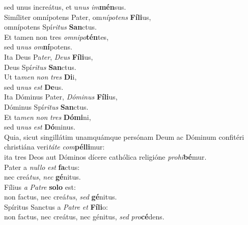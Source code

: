 \evenverse sed unus increátus, et u\textit{nus} \textit{im}\textbf{mén}sus.\\
\oddverse Simíliter omnípotens Pater, om\textit{ní}\textit{po}\textit{tens} \textbf{Fí}\textbf{li}us,~\*\\
\oddverse omnípotens Spí\textit{ri}\textit{tus} \textbf{San}ctus.\\
\evenverse Et tamen non tres \textit{om}\textit{ni}\textit{po}\textbf{tén}tes,~\*\\
\evenverse sed u\textit{nus} \textit{om}\textbf{ní}potens.\\
\oddverse Ita Deus Pa\textit{ter}, \textit{De}\textit{us} \textbf{Fí}\textbf{li}us,~\*\\
\oddverse Deus Spí\textit{ri}\textit{tus} \textbf{San}ctus.\\
\evenverse Ut ta\textit{men} \textit{non} \textit{tres} \textbf{Di}i,~\*\\
\evenverse sed u\textit{nus} \textit{est} \textbf{De}us.\\
\oddverse Ita Dóminus Pater, \textit{Dó}\textit{mi}\textit{nus} \textbf{Fí}\textbf{li}us,~\*\\
\oddverse Dóminus Spí\textit{ri}\textit{tus} \textbf{San}ctus.\\
\evenverse Et ta\textit{men} \textit{non} \textit{tres} \textbf{Dó}\textbf{mi}ni,~\*\\
\evenverse sed u\textit{nus} \textit{est} \textbf{Dó}minus.\\
\oddverse Quia, sicut singillátim unamquámque persónam Deum ac Dóminum confitéri christiána veri\textit{tá}\textit{te} \textit{com}\textbf{pél}\textbf{li}mur:~\*\\
\oddverse ita tres Deos aut Dóminos dícere cathólica religióne \textit{pro}\textit{hi}\textbf{bé}mur.\\
\evenverse Pater a \textit{nul}\textit{lo} \textit{est} \textbf{fa}ctus:~\*\\
\evenverse nec creá\textit{tus}, \textit{nec} \textbf{gé}nitus.\\
\oddverse Fílius \textit{a} \textit{Pa}\textit{tre} \textbf{so}\textbf{lo} est:~\*\\
\oddverse non factus, nec creá\textit{tus}, \textit{sed} \textbf{gé}nitus.\\
\evenverse Spíritus Sanctus a \textit{Pa}\textit{tre} \textit{et} \textbf{Fí}\textbf{li}o:~\*\\
\evenverse non factus, nec creátus, nec génitus, \textit{sed} \textit{pro}\textbf{cé}dens.\\
